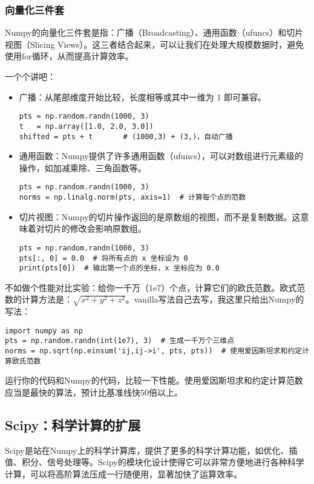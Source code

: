 \documentclass[../main.tex]{subfiles}
\begin{document}
\subsubsection{向量化三件套}

Numpy的向量化三件套是指：广播（Broadcasting）、通用函数（ufuncs）和切片视图（Slicing Views）。这三者结合起来，可以让我们在处理大规模数据时，避免使用for循环，从而提高计算效率。

一个个讲吧：
\begin{itemize}
  \item 广播：从尾部维度开始比较，长度相等或其中一维为 1 即可兼容。
    \begin{lstlisting}
pts = np.random.randn(1000, 3)
t   = np.array([1.0, 2.0, 3.0])
shifted = pts + t       # (1000,3) + (3,)，自动广播
    \end{lstlisting}
  \item 通用函数：Numpy提供了许多通用函数（ufuncs），可以对数组进行元素级的操作，如加减乘除、三角函数等。
    \begin{lstlisting}
pts = np.random.randn(1000, 3)
norms = np.linalg.norm(pts, axis=1)  # 计算每个点的范数
\end{lstlisting}
  \item 切片视图：Numpy的切片操作返回的是原数组的视图，而不是复制数据。这意味着对切片的修改会影响原数组。
    \begin{lstlisting}
pts = np.random.randn(1000, 3)
pts[:, 0] = 0.0  # 将所有点的 x 坐标设为 0
print(pts[0])  # 输出第一个点的坐标，x 坐标应为 0.0
    \end{lstlisting}
\end{itemize}

不如做个性能对比实验：给你一千万（1e7）个点，计算它们的欧氏范数。欧式范数的计算方法是：$\sqrt{x^2 + y^2 + z^2}$。vanilla写法自己去写，我这里只给出Numpy的写法：
\begin{lstlisting}
import numpy as np
pts = np.random.randn(int(1e7), 3)  # 生成一千万个三维点
norms = np.sqrt(np.einsum('ij,ij->i', pts, pts))  # 使用爱因斯坦求和约定计算欧氏范数
\end{lstlisting}
运行你的代码和Numpy的代码，比较一下性能。使用爱因斯坦求和约定计算范数应当是最快的算法，预计比基准线快50倍以上。

\subsection{Scipy：科学计算的扩展}

Scipy是站在Numpy上的科学计算库，提供了更多的科学计算功能，如优化、插值、积分、信号处理等。Scipy的模块化设计使得它可以非常方便地进行各种科学计算，可以将高阶算法压成一行随便用，显著加快了运算效率。
\end{document}
